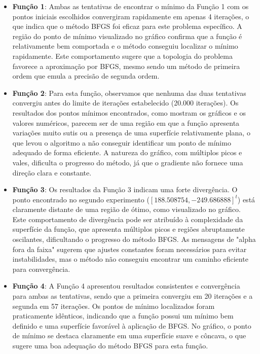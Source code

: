 \documentclass[a4paper, 12pt]{article}
\begin{document}
\begin{itemize}
    \item \textbf{Função 1}: Ambas as tentativas de encontrar o mínimo da Função 1 com os pontos iniciais escolhidos convergiram rapidamente em apenas 4 iterações, o que indica que o método BFGS foi eficaz para este problema específico. A região do ponto de mínimo visualizado no gráfico confirma que a função é relativamente bem comportada e o método conseguiu localizar o mínimo rapidamente. Este comportamento sugere que a topologia do problema favorece a aproximação por BFGS, mesmo sendo um método de primeira ordem que emula a precisão de segunda ordem.

    \item \textbf{Função 2}: Para esta função, observamos que nenhuma das duas tentativas convergiu antes do limite de iterações estabelecido (20.000 iterações). Os resultados dos pontos mínimos encontrados, como mostram os gráficos e os valores numéricos, parecem ser de uma região em que a função apresenta variações muito sutis ou a presença de uma superfície relativamente plana, o que levou o algoritmo a não conseguir identificar um ponto de mínimo adequado de forma eficiente. A natureza do gráfico, com múltiplos picos e vales, dificulta o progresso do método, já que o gradiente não fornece uma direção clara e constante.

    \item \textbf{Função 3}: Os resultados da Função 3 indicam uma forte divergência. O ponto encontrado no segundo experimento (\([188.508754, -249.686888]^t\)) está claramente distante de uma região de ótimo, como visualizado no gráfico. Este comportamento de divergência pode ser atribuído à complexidade da superfície da função, que apresenta múltiplos picos e regiões abruptamente oscilantes, dificultando o progresso do método BFGS. As mensagens de "alpha fora da faixa" sugerem que ajustes constantes foram necessários para evitar instabilidades, mas o método não conseguiu encontrar um caminho eficiente para convergência.

    \item \textbf{Função 4}: A Função 4 apresentou resultados consistentes e convergência para ambas as tentativas, sendo que a primeira convergiu em 20 iterações e a segunda em 57 iterações. Os pontos de mínimo localizados foram praticamente idênticos, indicando que a função possui um mínimo bem definido e uma superfície favorável à aplicação de BFGS. No gráfico, o ponto de mínimo se destaca claramente em uma superfície suave e côncava, o que sugere uma boa adequação do método BFGS para esta função.
\end{itemize}
\end{document}
